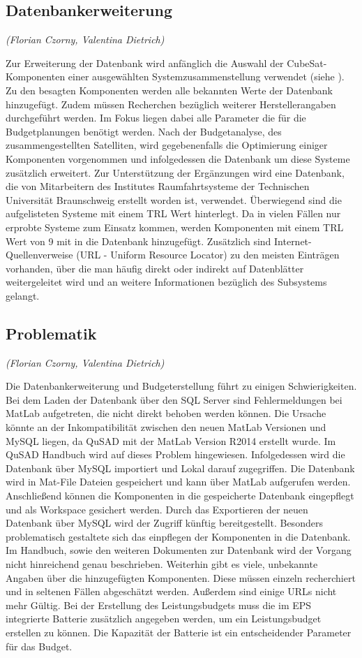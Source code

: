 			\subsection{Datenbankerweiterung}
			\hfill\emph{(Florian Czorny, Valentina Dietrich)}
			
			Zur Erweiterung der Datenbank wird anfänglich die Auswahl der CubeSat-Komponenten einer ausgewählten Systemzusammenstellung verwendet (siehe ). Zu den besagten Komponenten werden alle bekannten Werte der Datenbank hinzugefügt. Zudem müssen Recherchen bezüglich weiterer Herstellerangaben durchgeführt werden. Im Fokus liegen dabei alle Parameter die für die Budgetplanungen benötigt werden. Nach der Budgetanalyse, des zusammengestellten Satelliten, wird gegebenenfalls die Optimierung einiger Komponenten vorgenommen und infolgedessen die Datenbank um diese Systeme zusätzlich erweitert. Zur Unterstützung der Ergänzungen wird eine  Datenbank, die von Mitarbeitern des Institutes Raumfahrtsysteme der Technischen Universität Braunschweig erstellt worden ist, verwendet. Überwiegend sind die aufgelisteten Systeme mit einem TRL Wert hinterlegt. Da in vielen Fällen nur erprobte Systeme zum Einsatz kommen, werden Komponenten mit einem TRL Wert von \num{9} mit in die Datenbank hinzugefügt. Zusätzlich sind Internet-Quellenverweise (URL - Uniform Resource Locator) zu den meisten Einträgen vorhanden, über die man häufig direkt oder indirekt auf Datenblätter weitergeleitet wird und an weitere Informationen bezüglich des Subsystems gelangt.
			
			\subsection{Problematik}
			\hfill\emph{(Florian Czorny, Valentina Dietrich)}
			
			Die Datenbankerweiterung und Budgeterstellung führt zu einigen Schwierigkeiten. Bei dem Laden der Datenbank über den SQL Server sind Fehlermeldungen bei MatLab aufgetreten, die nicht direkt behoben werden können. Die Ursache könnte an der Inkompatibilität zwischen den neuen MatLab Versionen und MySQL liegen, da QuSAD mit der MatLab Version R2014 erstellt wurde. Im QuSAD Handbuch wird auf dieses Problem hingewiesen. Infolgedessen wird die Datenbank über MySQL importiert und Lokal darauf zugegriffen. Die Datenbank wird in Mat-File Dateien gespeichert und kann über MatLab aufgerufen werden. Anschließend können die Komponenten in die gespeicherte Datenbank eingepflegt und als Workspace gesichert werden. Durch das Exportieren der neuen Datenbank über MySQL wird der Zugriff künftig bereitgestellt. Besonders problematisch gestaltete sich das einpflegen der Komponenten in die Datenbank. Im Handbuch, sowie den weiteren Dokumenten zur Datenbank wird der Vorgang nicht hinreichend genau beschrieben. Weiterhin gibt es viele, unbekannte Angaben über die hinzugefügten Komponenten. Diese müssen einzeln recherchiert und in seltenen Fällen abgeschätzt werden. Außerdem sind einige URLs nicht mehr Gültig. Bei der Erstellung des Leistungsbudgets muss die im EPS integrierte Batterie zusätzlich angegeben werden, um ein Leistungsbudget erstellen zu können. Die Kapazität der Batterie ist ein entscheidender Parameter für das Budget. 
		

